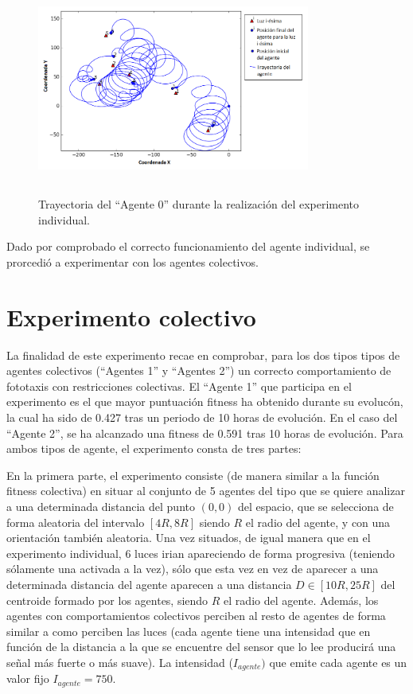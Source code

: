 \begin{figure}[H]
    \centering
    \includegraphics[width=0.8\textwidth,height=7cm]{Imagenes/Agente0Trayectoria}
    \caption{Trayectoria del ``Agente 0'' durante la realización del experimento individual.}
    \label{fig:agente0Trayectoria}
\end{figure}

Dado por comprobado el correcto funcionamiento del agente individual, se prorcedió a experimentar con los agentes colectivos.

\section{Experimento colectivo}
La finalidad de este experimento recae en comprobar, para los dos tipos tipos de agentes colectivos (``Agentes 1'' y ``Agentes 2'') un correcto comportamiento de fototaxis con restricciones colectivas. El ``Agente 1'' que participa en el experimento es el que mayor puntuación fitness ha obtenido durante su evolucón, la cual
ha sido de 0.427 tras un periodo de 10 horas de evolución. En el caso del ``Agente 2'', se ha alcanzado una fitness de 0.591 tras 10 horas de evolución. Para ambos tipos de agente, el experimento consta de tres partes:

En la primera parte, el experimento consiste (de manera similar a la función fitness colectiva) en situar al conjunto de 5 agentes del tipo que se quiere analizar a una determinada distancia del punto $(0,0)$ del espacio, que se selecciona de forma aleatoria del intervalo $[4R, 8R]$ siendo $R$ el radio del agente, y con una orientación también aleatoria.
Una vez situados, de igual manera que en el experimento individual, 6 luces irian apareciendo de forma progresiva (teniendo sólamente una activada a la vez), sólo que esta vez en vez de aparecer a una determinada distancia del agente aparecen a una distancia $D \in [10R, 25R]$ del centroide
formado por los agentes, siendo $R$ el radio del agente. Además, los agentes con comportamientos colectivos perciben al resto de agentes de forma similar a como perciben las luces (cada agente tiene una intensidad que en función de la distancia a la que se encuentre del sensor que lo lee producirá una señal
más fuerte o más suave). La intensidad ($I_{agente})$ que emite cada agente es un valor fijo $I_{agente} = 750$.

